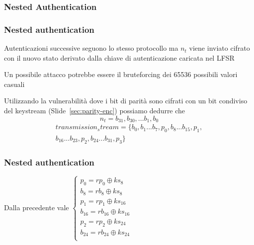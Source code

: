 \subsubsection{Nested Authentication}
\begin{frame}
    \frametitle{Nested authentication}\label{sec:nested-auth}
    Autenticazioni successive seguono lo stesso protocollo ma $n_t$ viene inviato cifrato con il nuovo stato derivato dalla chiave di autenticazione
    caricata nel LFSR\pause

    Un possibile attacco potrebbe essere il bruteforcing dei 65536 possibili valori casuali\pause

    Utilizzando la vulnerabilità dove i bit di parità sono cifrati con un bit condiviso del keystream (Slide~\ref{sec:parity-enc}) possiamo dedurre che
    \[n_t = {b_{31},b_{30}, ... b_1, b_0}\]
    \begin{multline*}
        transmission_stream = \{b_0, b_1 ... b_7, p_0, b_8 ... b_{15}, p_1, \\ b_{16} ... b_{23}, p_2, b_{24} ... b_{31}, p_3\}
    \end{multline*}

\end{frame}

\begin{frame}
    \frametitle{Nested authentication}
    Dalla precedente vale
    \begin{math}
        \begin{cases}
            p_0 = rp_0 \oplus ks_8\\
            b_8 = rb_8 \oplus ks_8\\
            p_1 = rp_1 \oplus ks_{16}\\
            b_{16} = rb_{16} \oplus ks_{16}\\
            p_2 = rp_2 \oplus ks_{24}\\
            b_{24} = rb_{24} \oplus ks_{24}\\
        \end{cases}
    \end{math}
\end{frame}

